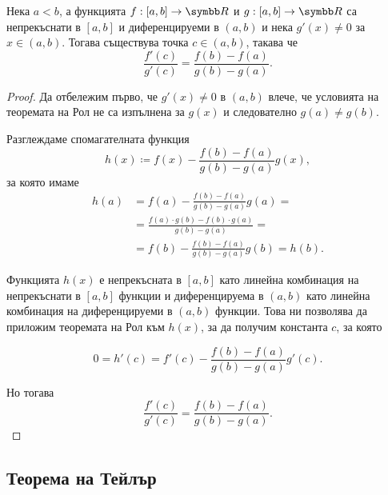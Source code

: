 \documentclass[
  headings=standardclasses,
  bibliography=totocnumbered,
]{scrartcl}
\begin{document}
\begin{theorem}
  Нека \( a < b \), а функцията \( f: [a, b] \to \R \) и \( g: [a, b] \to \R \) са непрекъснати в \( [a, b] \) и диференцируеми в \( (a, b) \) и нека \( g'(x) \neq 0 \) за \( x \in (a, b) \). Тогава съществува точка \( c \in (a, b) \), такава че
  \begin{equation*}
    \frac {f'(c)} {g'(c)} = \frac {f(b) - f(a)} {g(b) - g(a)}.
  \end{equation*}
\end{theorem}
\begin{proof}
  Да отбележим първо, че \( g'(x) \neq 0 \) в \( (a, b) \) влече, че условията на теоремата на Рол не са изпълнена за \( g(x) \) и следователно \( g(a) \neq g(b) \).

  Разглеждаме спомагателната функция
  \begin{equation*}
    h(x) \coloneqq f(x) - \frac {f(b) - f(a)} {g(b) - g(a)} g(x),
  \end{equation*}
  за която имаме
  \begin{align*}
    h(a)
    &=
    f(a) - \frac {f(b) - f(a)} {g(b) - g(a)} g(a)
    = \\ &=
    \frac {f(a) \cdot g(b) - f(b) \cdot g(a)} {g(b)-g(a)}
    = \\ &=
    f(b) - \frac {f(b) - f(a)} {g(b) - g(a)} g(b)
    =
    h(b).
  \end{align*}

  Функцията \( h(x) \) е непрекъсната в \( [a, b] \) като линейна комбинация на непрекъснати в \( [a, b] \) функции и диференцируема в \( (a, b) \) като линейна комбинация на диференцируеми в \( (a, b) \) функции. Това ни позволява да приложим теоремата на Рол към \( h(x) \), за да получим константа \( c \), за която

  \begin{equation*}
    0 = h'(c) = f'(c) - \frac {f(b) - f(a)} {g(b) - g(a)} g'(c).
  \end{equation*}

  Но тогава
  \begin{equation*}
    \frac {f'(c)} {g'(c)} = \frac {f(b) - f(a)} {g(b) - g(a)}.
  \end{equation*}
\end{proof}

\subsection{Теорема на Тейлър}
\end{document}
